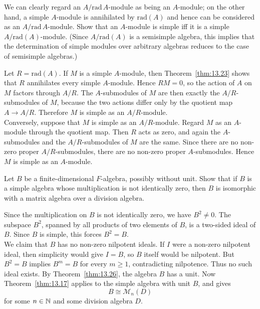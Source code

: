 \documentclass[../Odyssey_Project.tex]{subfiles}
\begin{document}
\begin{exercise}
\label{ex:13.10}
We can clearly regard an $A/\mathrm{rad}\, A$-module as being an $A$-module; on the other hand, a simple $A$-module is annihilated by $\mathrm{rad}(A)$ and hence can be considered as an $A/\mathrm{rad}\, A$-module. Show that an $A$-module is simple iff it is a simple $A/\mathrm{rad}(A)$-module. (Since $A/\mathrm{rad}(A)$ is a semisimple algebra, this implies that the determination of simple modules over arbitrary algebras reduces to the case of semisimple algebras.)
\end{exercise}
\begin{solution}
    Let $R=\mathrm{rad}(A)$. If $M$ is a simple $A$-module, then Theorem~\ref{thm:13.23} shows that $R$ annihilates every simple $A$-module. Hence $RM=0$, so the action of $A$ on $M$ factors through $A/R$. The $A$-submodules of $M$ are then exactly the $A/R$-submodules of $M$, because the two actions differ only by the quotient map $A\to A/R$. Therefore $M$ is simple as an $A/R$-module.\\
    Conversely, suppose that $M$ is simple as an $A/R$-module. Regard $M$ as an $A$-module through the quotient map. Then $R$ acts as zero, and again the $A$-submodules and the $A/R$-submodules of $M$ are the same. Since there are no non-zero proper $A/R$-submodules, there are no non-zero proper $A$-submodules. Hence $M$ is simple as an $A$-module.
\end{solution}

\begin{exercise}
\label{ex:13.11}
Let $B$ be a finite-dimensional $F$-algebra, possibly without unit. Show that if $B$ is a simple algebra whose multiplication is not identically zero, then $B$ is isomorphic with a matrix algebra over a division algebra.
\end{exercise}
\begin{solution}
    Since the multiplication on $B$ is not identically zero, we have $B^2\neq0$. The subspace $B^2$, spanned by all products of two elements of $B$, is a two-sided ideal of $B$. Since $B$ is simple, this forces $B^2=B$.\\
    We claim that $B$ has no non-zero nilpotent ideals. If $I$ were a non-zero nilpotent ideal, then simplicity would give $I=B$, so $B$ itself would be nilpotent. But $B^2=B$ implies $B^m=B$ for every $m\geq1$, contradicting nilpotence. Thus no such ideal exists. By Theorem~\ref{thm:13.26}, the algebra $B$ has a unit. Now Theorem~\ref{thm:13.17} applies to the simple algebra with unit $B$, and gives
    \[
        B\cong \mathcal{M}_n(D)
    \]
    for some $n\in\mathbb{N}$ and some division algebra $D$.
\end{solution}
\end{document}
